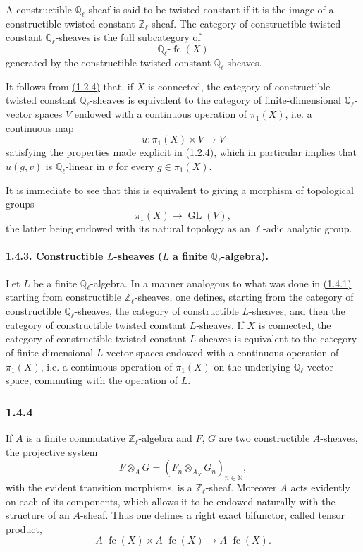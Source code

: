 \documentclass[11pt]{article}
\providecommand{\GL}{\operatorname{GL}}
\providecommand{\fc}{\operatorname{fc}}
\begin{document}
A constructible \(\mathbb Q_\ell\)-sheaf is said to be twisted constant if it is the image of a constructible twisted constant \(\mathbb Z_\ell\)-sheaf. The category of constructible twisted constant \(\mathbb Q_\ell\)-sheaves is the full subcategory of
\[
\mathbb Q_\ell\text{-}\fc(X)
\]
generated by the constructible twisted constant \(\mathbb Q_\ell\)-sheaves.

It follows from \hyperref[sga5:VI:subsubsection:1.2.4]{(1.2.4)} that, if \(X\) is connected, the category of constructible twisted constant \(\mathbb Q_\ell\)-sheaves is equivalent to the category of finite-dimensional \(\mathbb Q_\ell\)-vector spaces \(V\) endowed with a continuous operation of \(\pi_1(X)\), i.e. a continuous map
\[
u:\pi_1(X)\times V\longrightarrow V
\]
satisfying the properties made explicit in \hyperref[sga5:VI:subsubsection:1.2.4]{(1.2.4)}, which in particular implies that \(u(g,v)\) is \(\mathbb Q_\ell\)-linear in \(v\) for every \(g\in\pi_1(X)\).

It is immediate to see that this is equivalent to giving a morphism of topological groups
\[
\pi_1(X)\longrightarrow \GL(V),
\]
the latter being endowed with its natural topology as an \(\ell\)-adic analytic group.

\paragraph{1.4.3. Constructible \(L\)-sheaves (\(L\) a finite \(\mathbb Q_\ell\)-algebra).}\label{sga5:VI:paragraph:1.4.3}
Let \(L\) be a finite \(\mathbb Q_\ell\)-algebra. In a manner analogous to what was done in \hyperref[sga5:VI:paragraph:1.4.1]{(1.4.1)} starting from constructible \(\mathbb Z_\ell\)-sheaves, one defines, starting from the category of constructible \(\mathbb Q_\ell\)-sheaves, the category of constructible \(L\)-sheaves, and then the category of constructible twisted constant \(L\)-sheaves. If \(X\) is connected, the category of constructible twisted constant \(L\)-sheaves is equivalent to the category of finite-dimensional \(L\)-vector spaces endowed with a continuous operation of \(\pi_1(X)\), i.e. a continuous operation of \(\pi_1(X)\) on the underlying \(\mathbb Q_\ell\)-vector space, commuting with the operation of \(L\).

\subsubsection*{1.4.4}\label{sga5:VI:subsubsection:1.4.4}
If \(A\) is a finite commutative \(\mathbb Z_\ell\)-algebra and \(F\), \(G\) are two constructible \(A\)-sheaves, the projective system
\[
F\otimes_A G=(F_n\otimes_{A_X} G_n)_{n\in\mathbb N},
\]
with the evident transition morphisms, is a \(\mathbb Z_\ell\)-sheaf. Moreover \(A\) acts evidently on each of its components, which allows it to be endowed naturally with the structure of an \(A\)-sheaf. Thus one defines a right exact bifunctor, called tensor product,
\[
A\text{-}\fc(X)\times A\text{-}\fc(X)\longrightarrow A\text{-}\fc(X).
\]
\end{document}
